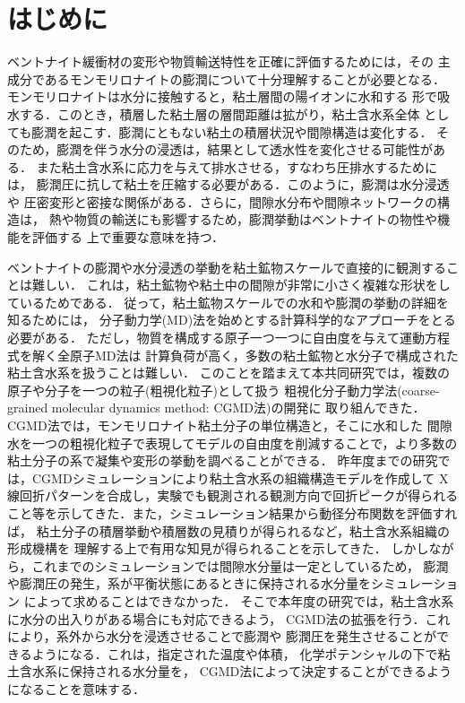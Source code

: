 \section{はじめに}
ベントナイト緩衝材の変形や物質輸送特性を正確に評価するためには，その
主成分であるモンモリロナイトの膨潤について十分理解することが必要となる．
モンモリロナイトは水分に接触すると，粘土層間の陽イオンに水和する
形で吸水する．このとき，積層した粘土層の層間距離は拡がり，粘土含水系全体
としても膨潤を起こす．膨潤にともない粘土の積層状況や間隙構造は変化する．
そのため，膨潤を伴う水分の浸透は，結果として透水性を変化させる可能性がある．
また粘土含水系に応力を与えて排水させる，すなわち圧排水するためには， 
膨潤圧に抗して粘土を圧縮する必要がある．このように，膨潤は水分浸透や
圧密変形と密接な関係がある．さらに，間隙水分布や間隙ネットワークの構造は，
熱や物質の輸送にも影響するため，膨潤挙動はベントナイトの物性や機能を評価する
上で重要な意味を持つ．

ベントナイトの膨潤や水分浸透の挙動を粘土鉱物スケールで直接的に観測することは難しい．
これは，粘土鉱物や粘土中の間隙が非常に小さく複雑な形状をしているためである．
従って，粘土鉱物スケールでの水和や膨潤の挙動の詳細を知るためには，
分子動力学(MD)法を始めとする計算科学的なアプローチをとる必要がある．
ただし，物質を構成する原子一つ一つに自由度を与えて運動方程式を解く全原子MD法は
計算負荷が高く，多数の粘土鉱物と水分子で構成された粘土含水系を扱うことは難しい．
このことを踏まえて本共同研究では，複数の原子や分子を一つの粒子(粗視化粒子)として扱う
粗視化分子動力学法(coarse-grained molecular dynamics method: CGMD法)の開発に
取り組んできた．CGMD法では，モンモリロナイト粘土分子の単位構造と，そこに水和した
間隙水を一つの粗視化粒子で表現してモデルの自由度を削減することで，より多数の
粘土分子の系で凝集や変形の挙動を調べることができる．
昨年度までの研究では，CGMDシミュレーションにより粘土含水系の組織構造モデルを作成して
X線回折パターンを合成し，実験でも観測される観測方向で回折ピークが得られる
こと等を示してきた．また，シミュレーション結果から動径分布関数を評価すれば，
粘土分子の積層挙動や積層数の見積りが得られるなど，粘土含水系組織の形成機構を
理解する上で有用な知見が得られることを示してきた．
しかしながら，これまでのシミュレーションでは間隙水分量は一定としているため，
膨潤や膨潤圧の発生，系が平衡状態にあるときに保持される水分量をシミュレーション
によって求めることはできなかった．
そこで本年度の研究では，粘土含水系に水分の出入りがある場合にも対応できるよう，
CGMD法の拡張を行う．これにより，系外から水分を浸透させることで膨潤や
膨潤圧を発生させることができるようになる．これは，指定された温度や体積，
化学ポテンシャルの下で粘土含水系に保持される水分量を，
CGMD法によって決定することができるようになることを意味する．

